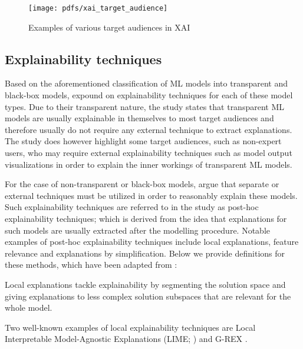 \begin{figure}[t]
  \centering
  \texttt{[image: pdfs/xai\_target\_audience]}
  \caption{Examples of various target audiences in XAI \citep{arrieta2020explainable}}
  \label{fig:xai_target_audience}
\end{figure}

\subsection{Explainability techniques}

Based on the aforementioned classification of ML models into transparent and black-box models, \citet{arrieta2020explainable} expound on explainability techniques for each of these model types. Due to their transparent nature, the study states that transparent ML models are usually explainable in themselves to most target audiences and therefore usually do not require any external technique to extract explanations. The study does however highlight some target audiences, such as non-expert users, who may require external explainability techniques such as model output visualizations in order to explain the inner workings of transparent ML models.

For the case of non-transparent or black-box models, \citet{arrieta2020explainable} argue that separate or external techniques must be utilized in order to reasonably explain these models. Such explainability techniques are referred to in the study as post-hoc explainability techniques; which is derived from the idea that explanations for such models are usually extracted after the modelling procedure. Notable examples of post-hoc explainability techniques include local explanations, feature relevance and explanations by simplification. Below we provide definitions for these methods, which have been adapted from \citet{arrieta2020explainable}:

\begin{definition}
  Local explanations tackle explainability by segmenting the solution space and giving explanations to less complex solution subspaces that are relevant for the whole model.
\end{definition}

\begin{remark}
  Two well-known examples of local explainability techniques are Local Interpretable Model-Agnostic Explanations (LIME; \citealt{lime}) and G-REX \citep{konig2008g}.
\end{remark}

